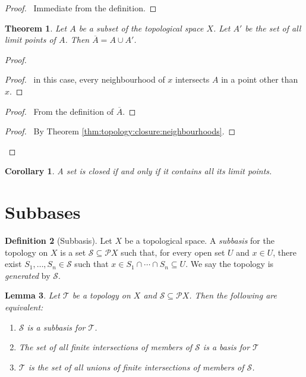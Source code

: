 \documentclass{report}
\let\qed\relax
\newtheorem{lm}{Lemma}[section]
\newtheorem{thm}[lm]{Theorem}
\newtheorem{cor}{Corollary}[lm]
\theoremstyle{definition}
\newtheorem{df}[lm]{Definition}
\begin{document}
  \begin{proof}
    \pf\ Immediate from the definition. \qed
  \end{proof}

  \begin{thm}
    Let $A$ be a subset of the topological space $X$. Let $A'$ be the set of
    all
    limit points of $A$. Then $\overline{A} = A \cup A'$.
  \end{thm}

  \begin{proof}
    \pf
    \begin{proof}
      \pf\ in this case, every neighbourhood of $x$ intersects $A$ in a point
      other than $x$.
    \end{proof}
    \begin{proof}
      \pf\ From the definition of $\overline{A}$.
    \end{proof}
    \begin{proof}
      \pf\ By Theorem \ref{thm:topology:closure:neighbourhoods}.
    \end{proof}
    \qed
  \end{proof}

  \begin{cor}
    \label{cor:topology:limit_point:closed}
    A set is closed if and only if it contains all its limit points.
  \end{cor}

  \section{Subbases}

  \begin{df}[Subbasis]
    Let $X$ be a topological space. A \emph{subbasis} for the topology on $X$
    is
    a set $\mathcal{S} \subseteq \mathcal{P} X$ such that, for every open set
    $U$
    and $x \in U$, there exist $S_1, \ldots, S_n \in \mathcal{S}$ such that $x
    \in S_1 \cap \cdots \cap S_n \subseteq U$. We say the topology is
    \emph{generated} by $\mathcal{S}$.
  \end{df}

  \begin{lm}
    \label{lm:topology:subbasis:generate}
    Let $\mathcal{T}$ be a topology on $X$ and $\mathcal{S}
    \subseteq \mathcal{P} X$.   Then the following are equivalent:
    \begin{enumerate}
      \item $\mathcal{S}$ is a subbasis for $\mathcal{T}$.
      \item The set of all finite intersections of members of $\mathcal{S}$ is
      a
      basis for $\mathcal{T}$
      \item $\mathcal{T}$ is the set of all unions of finite intersections of
      members of $\mathcal{S}$.
    \end{enumerate}
  \end{lm}
\end{document}
